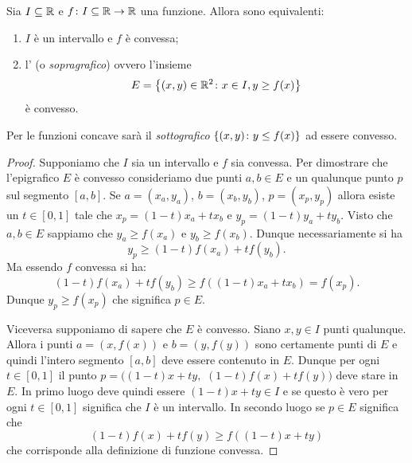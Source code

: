 \begin{theorem}
Sia $I\subseteq \mathbb R$ e $f\colon I\subseteq \mathbb R\to \mathbb R$ una funzione.
Allora sono equivalenti:
\begin{enumerate}
\item $I$ è un intervallo e $f$ è convessa;
\item l' (o \emph{sopragrafico})
ovvero l'insieme
\[
  E = {\left\{ (x,y)\in \mathbb R^2\colon x\in I, y\ge f(x) \right\}}
\]
è convesso.
\end{enumerate}

Per le funzioni concave sarà il \emph{sottografico} ${\left\{ (x,y)\colon y\le f(x) \right\}}$ ad essere convesso.
\end{theorem}
%
\begin{proof}
Supponiamo che $I$ sia un intervallo e $f$ sia convessa. Per dimostrare che l'epigrafico $E$ è convesso consideriamo due punti $a,b\in E$ e un qualunque punto $p$ sul segmento $[a,b]$.
Se $a=(x_a, y_a)$, $b=(x_b,y_b)$, $p=(x_p, y_p)$
allora esiste un $t\in [0,1]$ tale che $x_p = (1-t)x_a + t x_b$ e $y_p=(1-t)y_a + t y_b$.
Visto che $a,b\in E$ sappiamo che $y_a \ge f(x_a)$ e $y_b\ge f(x_b)$. Dunque necessariamente si ha
\[
  y_p \ge (1-t)f(x_a) + t f(y_b).
\]
Ma essendo $f$ convessa si ha:
\[
  (1-t)f(x_a) + t f(y_b) \ge f((1-t)x_a + t x_b) = f(x_p).
\]
Dunque $y_p\ge f(x_p)$ che significa $p\in E$.

Viceversa supponiamo di sapere che $E$ è convesso. Siano $x,y\in I$ punti qualunque. Allora i punti $a=(x,f(x))$ e $b=(y,f(y))$ sono certamente punti di $E$ e quindi l'intero segmento $[a,b]$ deve essere contenuto in $E$. Dunque per ogni $t\in [0,1]$ il punto $p = ((1-t)x + t y,$ $(1-t)f(x)+ tf(y))$ deve stare in $E$. In primo luogo deve quindi essere $(1-t)x+ty\in I$ e se questo è vero per ogni $t\in[0,1]$ significa che $I$ è un intervallo. In secondo luogo se $p\in E$ significa che
\[
  (1-t)f(x) +t f(y) \ge f((1-t)x + t y)
\]
che corrisponde alla definizione di funzione convessa.
\end{proof}


